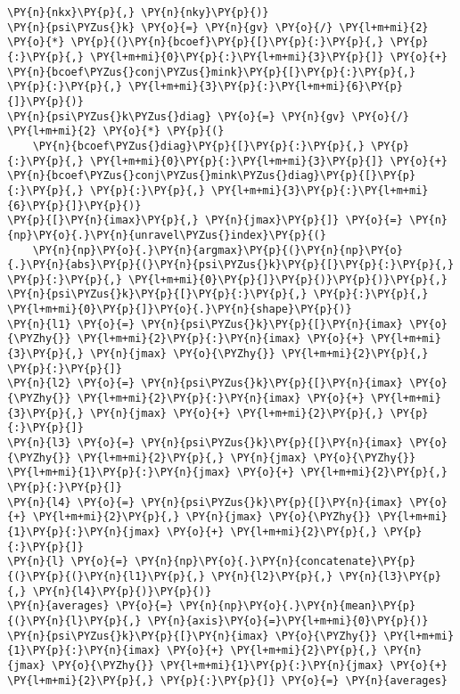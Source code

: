 \begin{Verbatim}[commandchars=\\\{\}]
                                     \PY{n}{nkx}\PY{p}{,} \PY{n}{nky}\PY{p}{)}
\PY{n}{psi\PYZus{}k} \PY{o}{=} \PY{n}{gv} \PY{o}{/} \PY{l+m+mi}{2} \PY{o}{*} \PY{p}{(}\PY{n}{bcoef}\PY{p}{[}\PY{p}{:}\PY{p}{,} \PY{p}{:}\PY{p}{,} \PY{l+m+mi}{0}\PY{p}{:}\PY{l+m+mi}{3}\PY{p}{]} \PY{o}{+} \PY{n}{bcoef\PYZus{}conj\PYZus{}mink}\PY{p}{[}\PY{p}{:}\PY{p}{,} \PY{p}{:}\PY{p}{,} \PY{l+m+mi}{3}\PY{p}{:}\PY{l+m+mi}{6}\PY{p}{]}\PY{p}{)}
\PY{n}{psi\PYZus{}k\PYZus{}diag} \PY{o}{=} \PY{n}{gv} \PY{o}{/} \PY{l+m+mi}{2} \PY{o}{*} \PY{p}{(}
    \PY{n}{bcoef\PYZus{}diag}\PY{p}{[}\PY{p}{:}\PY{p}{,} \PY{p}{:}\PY{p}{,} \PY{l+m+mi}{0}\PY{p}{:}\PY{l+m+mi}{3}\PY{p}{]} \PY{o}{+} \PY{n}{bcoef\PYZus{}conj\PYZus{}mink\PYZus{}diag}\PY{p}{[}\PY{p}{:}\PY{p}{,} \PY{p}{:}\PY{p}{,} \PY{l+m+mi}{3}\PY{p}{:}\PY{l+m+mi}{6}\PY{p}{]}\PY{p}{)}
\PY{p}{[}\PY{n}{imax}\PY{p}{,} \PY{n}{jmax}\PY{p}{]} \PY{o}{=} \PY{n}{np}\PY{o}{.}\PY{n}{unravel\PYZus{}index}\PY{p}{(}
    \PY{n}{np}\PY{o}{.}\PY{n}{argmax}\PY{p}{(}\PY{n}{np}\PY{o}{.}\PY{n}{abs}\PY{p}{(}\PY{n}{psi\PYZus{}k}\PY{p}{[}\PY{p}{:}\PY{p}{,} \PY{p}{:}\PY{p}{,} \PY{l+m+mi}{0}\PY{p}{]}\PY{p}{)}\PY{p}{)}\PY{p}{,} \PY{n}{psi\PYZus{}k}\PY{p}{[}\PY{p}{:}\PY{p}{,} \PY{p}{:}\PY{p}{,} \PY{l+m+mi}{0}\PY{p}{]}\PY{o}{.}\PY{n}{shape}\PY{p}{)}
\PY{n}{l1} \PY{o}{=} \PY{n}{psi\PYZus{}k}\PY{p}{[}\PY{n}{imax} \PY{o}{\PYZhy{}} \PY{l+m+mi}{2}\PY{p}{:}\PY{n}{imax} \PY{o}{+} \PY{l+m+mi}{3}\PY{p}{,} \PY{n}{jmax} \PY{o}{\PYZhy{}} \PY{l+m+mi}{2}\PY{p}{,} \PY{p}{:}\PY{p}{]}
\PY{n}{l2} \PY{o}{=} \PY{n}{psi\PYZus{}k}\PY{p}{[}\PY{n}{imax} \PY{o}{\PYZhy{}} \PY{l+m+mi}{2}\PY{p}{:}\PY{n}{imax} \PY{o}{+} \PY{l+m+mi}{3}\PY{p}{,} \PY{n}{jmax} \PY{o}{+} \PY{l+m+mi}{2}\PY{p}{,} \PY{p}{:}\PY{p}{]}
\PY{n}{l3} \PY{o}{=} \PY{n}{psi\PYZus{}k}\PY{p}{[}\PY{n}{imax} \PY{o}{\PYZhy{}} \PY{l+m+mi}{2}\PY{p}{,} \PY{n}{jmax} \PY{o}{\PYZhy{}} \PY{l+m+mi}{1}\PY{p}{:}\PY{n}{jmax} \PY{o}{+} \PY{l+m+mi}{2}\PY{p}{,} \PY{p}{:}\PY{p}{]}
\PY{n}{l4} \PY{o}{=} \PY{n}{psi\PYZus{}k}\PY{p}{[}\PY{n}{imax} \PY{o}{+} \PY{l+m+mi}{2}\PY{p}{,} \PY{n}{jmax} \PY{o}{\PYZhy{}} \PY{l+m+mi}{1}\PY{p}{:}\PY{n}{jmax} \PY{o}{+} \PY{l+m+mi}{2}\PY{p}{,} \PY{p}{:}\PY{p}{]}
\PY{n}{l} \PY{o}{=} \PY{n}{np}\PY{o}{.}\PY{n}{concatenate}\PY{p}{(}\PY{p}{(}\PY{n}{l1}\PY{p}{,} \PY{n}{l2}\PY{p}{,} \PY{n}{l3}\PY{p}{,} \PY{n}{l4}\PY{p}{)}\PY{p}{)}
\PY{n}{averages} \PY{o}{=} \PY{n}{np}\PY{o}{.}\PY{n}{mean}\PY{p}{(}\PY{n}{l}\PY{p}{,} \PY{n}{axis}\PY{o}{=}\PY{l+m+mi}{0}\PY{p}{)}
\PY{n}{psi\PYZus{}k}\PY{p}{[}\PY{n}{imax} \PY{o}{\PYZhy{}} \PY{l+m+mi}{1}\PY{p}{:}\PY{n}{imax} \PY{o}{+} \PY{l+m+mi}{2}\PY{p}{,} \PY{n}{jmax} \PY{o}{\PYZhy{}} \PY{l+m+mi}{1}\PY{p}{:}\PY{n}{jmax} \PY{o}{+} \PY{l+m+mi}{2}\PY{p}{,} \PY{p}{:}\PY{p}{]} \PY{o}{=} \PY{n}{averages}

\end{Verbatim}

